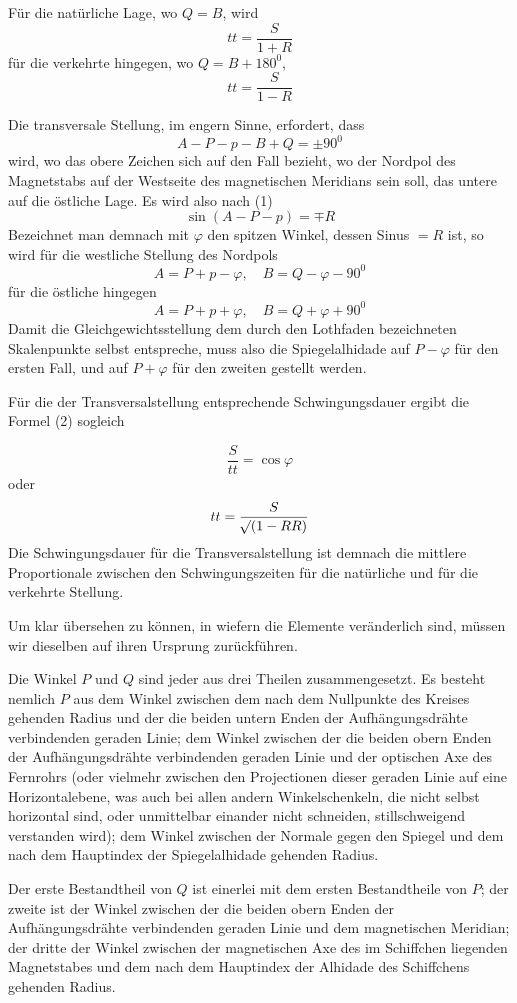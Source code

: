 Für die natürliche Lage, wo $Q=B$, wird
\[
tt=\frac{S}{1+R}
\]
für die verkehrte hingegen, wo $Q=B+180^0$,
\[
tt=\frac{S}{1-R}
\]

Die transversale Stellung, im engern Sinne, erfordert, dass
\[
A-P-p-B+Q=\pm90^0
\]
wird, wo das obere Zeichen sich auf den Fall bezieht, wo der Nordpol des Magnetstabs auf der Westseite des magnetischen Meridians sein soll, das untere auf die östliche Lage. Es wird also nach (1)
\[
\sin(A-P-p)=\mp R
\]
Bezeichnet man demnach mit $\varphi$ den spitzen Winkel, dessen Sinus $=R$ ist, so wird für die westliche Stellung des Nordpols
\[
A=P+p-\varphi,\quad B=Q-\varphi-90^0
\]
für die östliche hingegen
\[
A=P+p+\varphi,\quad B=Q+\varphi+90^0
\]
Damit die Gleichgewichtsstellung dem durch den Lothfaden bezeichneten Skalenpunkte selbst entspreche, muss also die Spiegelalhidade auf $P-\varphi$ für den ersten Fall, und auf $P+\varphi$ für den zweiten gestellt werden.

Für die der Transversalstellung entsprechende Schwingungsdauer ergibt die Formel (2) sogleich
\par\clearpage
{}
\[
\frac{S}{tt}=\cos\varphi
\]
oder
\[
tt=\frac{S}{\mathord{{}^{}\!\surd}(1-RR)}
\]
Die Schwingungsdauer für die Transversalstellung ist demnach die mittlere Proportionale zwischen den Schwingungszeiten für die natürliche und für die verkehrte Stellung.

Um klar übersehen zu können, in wiefern die Elemente veränderlich sind, müssen wir dieselben auf ihren Ursprung zurückführen.

Die Winkel $P$ und $Q$ sind jeder aus drei Theilen zusammengesetzt. Es besteht nemlich $P$ aus dem Winkel zwischen dem nach dem Nullpunkte des Kreises gehenden Radius und der die beiden untern Enden der Aufhängungsdrähte verbindenden geraden Linie; dem Winkel zwischen der die beiden obern Enden der Aufhängungsdrähte verbindenden geraden Linie und der optischen Axe des Fernrohrs (oder vielmehr zwischen den Projectionen dieser geraden Linie auf eine Horizontalebene, was auch bei allen andern Winkelschenkeln, die nicht selbst horizontal sind, oder unmittelbar einander nicht schneiden, stillschweigend verstanden wird); dem Winkel zwischen der Normale gegen den Spiegel und dem nach dem Hauptindex der Spiegelalhidade gehenden Radius.

Der erste Bestandtheil von $Q$ ist einerlei mit dem ersten Bestandtheile von $P$; der zweite ist der Winkel zwischen der die beiden obern Enden der Aufhängungsdrähte verbindenden geraden Linie und dem magnetischen Meridian; der dritte der Winkel zwischen der magnetischen Axe des im Schiffchen liegenden Magnetstabes und dem nach dem Hauptindex der Alhidade des Schiffchens gehenden Radius.

